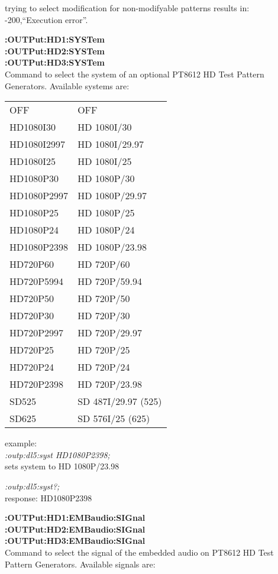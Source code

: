 trying to select modification for non-modifyable patterns results in: -200,``Execution error''.

\textbf{:OUTPut:HD1:SYSTem}\\
\textbf{:OUTPut:HD2:SYSTem}\\
\textbf{:OUTPut:HD3:SYSTem}\\
Command to select the system of an optional PT8612 HD Test Pattern Generators.  Available systems are:

\begin{tabular}{l l }

OFF          &   OFF                  \\
HD1080I30    &   HD 1080I/30          \\
HD1080I2997  &   HD 1080I/29.97       \\
HD1080I25    &   HD 1080I/25          \\
HD1080P30    &   HD 1080P/30          \\
HD1080P2997  &   HD 1080P/29.97       \\
HD1080P25    &   HD 1080P/25          \\
HD1080P24    &   HD 1080P/24          \\
HD1080P2398  &   HD 1080P/23.98       \\
HD720P60     &   HD 720P/60           \\
HD720P5994   &   HD 720P/59.94        \\
HD720P50     &   HD 720P/50           \\
HD720P30     &   HD 720P/30           \\
HD720P2997   &   HD 720P/29.97        \\
HD720P25     &   HD 720P/25           \\
HD720P24     &   HD 720P/24           \\
HD720P2398   &   HD 720P/23.98        \\
SD525        &   SD 487I/29.97 (525)  \\
SD625        &   SD 576I/25 (625)     \\
\end{tabular}

example:\\
\textit{:outp:dl5:syst HD1080P2398;}\\
sets system to HD 1080P/23.98

\textit{:outp:dl5:syst?;}\\
response: HD1080P2398

\textbf{:OUTPut:HD1:EMBaudio:SIGnal}\\
\textbf{:OUTPut:HD2:EMBaudio:SIGnal}\\
\textbf{:OUTPut:HD3:EMBaudio:SIGnal}\\
Command to select the signal of the embedded audio on PT8612 HD Test Pattern Generators.  Available signals are:

